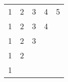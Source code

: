 \begin{tabular}{ |c|c|c|c|c| }
\hline
1 & 2 & 3 & 4 & 5 \\ 
1 & 2 & 3 & 4 &   \\ 
1 & 2 & 3 &   &   \\ 
1 & 2 &   &   &   \\ 
1 &   &   &   &   \\ 
\hline
\end{tabular}